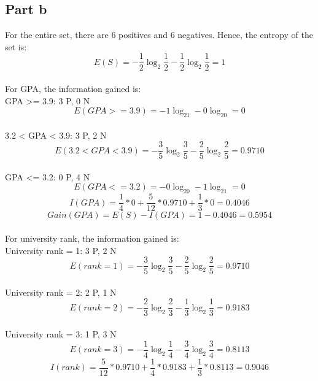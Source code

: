 \documentclass[12pt]{article}
\begin{document}
\subsection*{Part b}
For the entire set, there are 6 positives and 6 negatives. Hence, the entropy of the set is:
\\
\begin{equation}
E(S) = -\frac{1}{2}\log_2\frac{1}{2} -\frac{1}{2}\log_2\frac{1}{2} = 1
\end{equation}
\\
For GPA, the information gained is:
\\
GPA >= 3.9: 3 P, 0 N
\begin{equation}
E(GPA >= 3.9) = -1\log_21 -0\log_20 = 0
\end{equation}
\\
3.2 < GPA < 3.9: 3 P, 2 N
\begin{equation}
E(3.2 < GPA < 3.9) = -\frac{3}{5}\log_2\frac{3}{5} -\frac{2}{5}\log_2\frac{2}{5} = 0.9710
\end{equation}
\\
GPA <= 3.2: 0 P, 4 N
\begin{equation}
E(GPA <= 3.2) = -0\log_20 -1\log_21 = 0
\end{equation}
\begin{equation}
I(GPA) = \frac{1}{4} * 0 + \frac{5}{12} * 0.9710 + \frac{1}{3} * 0 = 0.4046
\end{equation}
\begin{equation}
Gain(GPA) = E(S) - I(GPA) = 1 - 0.4046 = 0.5954
\end{equation}
\\
For university rank, the information gained is:
\\
University rank = 1: 3 P, 2 N
\begin{equation}
E(rank = 1) = -\frac{3}{5}\log_2\frac{3}{5} -\frac{2}{5}\log_2\frac{2}{5} = 0.9710
\end{equation}
\\
University rank = 2: 2 P, 1 N
\begin{equation}
E(rank = 2) = -\frac{2}{3}\log_2\frac{2}{3} -\frac{1}{3}\log_2\frac{1}{3} = 0.9183
\end{equation}
\\
University rank = 3: 1 P, 3 N
\begin{equation}
E(rank = 3) = -\frac{1}{4}\log_2\frac{1}{4} -\frac{3}{4}\log_2\frac{3}{4} = 0.8113
\end{equation}
\begin{equation}
I(rank) = \frac{5}{12} * 0.9710 + \frac{1}{4} * 0.9183 + \frac{1}{3} * 0.8113 = 0.9046
\end{equation}
\end{document}
